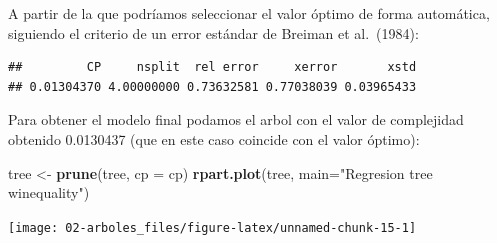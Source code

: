 \documentclass[
]{book}
\newenvironment{Shaded}{\begin{snugshade}}{\end{snugshade}}
\newcommand{\CommentTok}[1]{\textcolor[rgb]{0.56,0.35,0.01}{\textit{#1}}}
\newcommand{\DataTypeTok}[1]{\textcolor[rgb]{0.13,0.29,0.53}{#1}}
\newcommand{\KeywordTok}[1]{\textcolor[rgb]{0.13,0.29,0.53}{\textbf{#1}}}
\newcommand{\NormalTok}[1]{#1}
\newcommand{\OperatorTok}[1]{\textcolor[rgb]{0.81,0.36,0.00}{\textbf{#1}}}
\newcommand{\StringTok}[1]{\textcolor[rgb]{0.31,0.60,0.02}{#1}}
\theoremstyle{break}
\theoremstyle{definition}
\theoremstyle{definition}
\theoremstyle{definition}
\theoremstyle{remark}
\begin{document}
A partir de la que podríamos seleccionar el valor óptimo de forma automática,
siguiendo el criterio de un error estándar de Breiman et al.~(1984):

\begin{Shaded}
\end{Shaded}

\begin{verbatim}
##         CP     nsplit  rel error     xerror       xstd 
## 0.01304370 4.00000000 0.73632581 0.77038039 0.03965433
\end{verbatim}

\begin{Shaded}
\end{Shaded}

Para obtener el modelo final podamos el arbol con el valor de complejidad obtenido 0.0130437 (que en este caso coincide con el valor óptimo):

\begin{Shaded}
\begin{Highlighting}[]
\NormalTok{tree <-}\StringTok{ }\KeywordTok{prune}\NormalTok{(tree, }\DataTypeTok{cp =}\NormalTok{ cp)}
\KeywordTok{rpart.plot}\NormalTok{(tree, }\DataTypeTok{main=}\StringTok{"Regresion tree winequality"}\NormalTok{) }
\end{Highlighting}
\end{Shaded}

\begin{center}\texttt{[image: 02-arboles\_files/figure-latex/unnamed-chunk-15-1]} \end{center}
\end{document}
